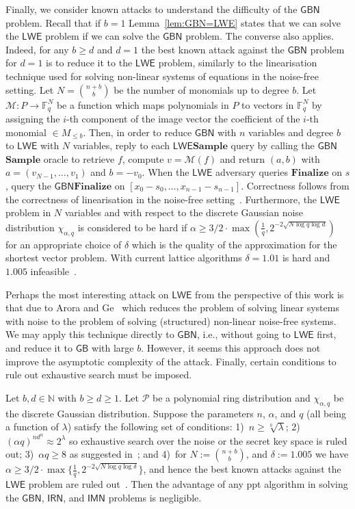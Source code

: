 \documentclass[draft]{llncs}
\newcommand{\heading}[1]{{\vspace{6pt}\noindent\sc{#1.}}}
\newcommand{\ring}[1]{\mathbb{#1}}
\newcommand{\F}{\ensuremath{\ring{F}}\xspace}
\newcommand{\GB}{\ensuremath{\mathsf{GB}}\xspace}
\newcommand{\GBN}{\ensuremath{\mathsf{GBN}}\xspace}
\newcommand{\IRN}{\ensuremath{\mathsf{IRN}}\xspace}
\newcommand{\IMN}{\ensuremath{\mathsf{IMN}}\xspace}
\newcommand{\LWE}{\ensuremath{\mathsf{LWE}}\xspace}
\newcommand{\secpar}{\lambda}
\newcommand{\Finalize}{\mathbf{Finalize}}
\newcommand{\Sample}{\mathbf{Sample}}
\begin{document}
\heading{Known Attacks} Finally, we consider known attacks to understand the difficulty of the \GBN problem. Recall that if $b=1$ Lemma~\ref{lem:GBN=LWE} states that we can solve the \LWE problem if we can solve the \GBN problem. The converse also applies. Indeed, for any $b\geq d$ and $d=1$ the best known attack against the \GBN problem for $d=1$ is to reduce it to the \LWE problem, similarly to the linearisation technique used for solving non-linear systems of equations in the noise-free setting.
Let $N = {n + b \choose b}$ be the number of monomials up to degree $b$. Let $\mathcal{M}: P \rightarrow \F_q^N$ be a function which maps polynomials in $P$ to vectors in $\F_q^N$ by assigning the $i$-th component of the image vector the coefficient of the $i$-th monomial $\in M_{\leq b}$. Then, in order to reduce \GBN with $n$ variables and degree $b$ to \LWE with $N$ variables, reply to each \LWE $\Sample$ query by calling the \GBN $\Sample$ oracle to retrieve $f$, compute $v = \mathcal{M}(f)$ and return $(a,b)$ with $a=(v_{N-1},\dots,v_{1})$ and $b=-v_0$. When the \LWE adversary queries $\Finalize$ on $s$, query the \GBN $\Finalize$ on $[x_0 - s_0,\dots,x_{n-1} - s_{n-1}]$. Correctness follows from the correctness of linearisation in the noise-free setting~\cite{Gr}. Furthermore, the \LWE problem in $N$ variables and with respect to the discrete Gaussian noise distribution $\chi_{\alpha,q}$ is considered to be hard if
$
\alpha \geq 3/2 \cdot \max ( \frac{1}{q}, 2^{-2\sqrt{N \log q \log d}} )
$
for an appropriate choice of $\delta$ which is the quality of the approximation for the shortest vector problem. 
 With current lattice algorithms $\delta = 1.01$ is hard and $1.005$ infeasible~\cite{MR09}. 

Perhaps the most interesting attack on \LWE from the perspective of this work is that due to Arora and Ge~\cite{Gr} which reduces the problem of solving linear systems with noise to the problem of solving (structured) non-linear noise-free systems. We may apply this technique directly to \GBN, i.e., without going to \LWE first, and reduce it to \GB with large $b$. However, it seems this approach does not improve the asymptotic complexity of the attack. Finally, certain conditions to rule out exhaustive search must be imposed.

\begin{definition}
Let $b,d \in\mathbb{N}$ with $b \geq d \geq 1$. Let $\mathcal{P}$ be a polynomial ring distribution and $\chi_{\alpha,q}$ be the discrete Gaussian distribution. Suppose the parameters $n$, $\alpha$, and $q$ (all being a function of $\secpar$) satisfy the following set of conditions: 1)~$n \geq \sqrt[b]{\secpar}$; 2)~$(\alpha q)^{nd^n} \approx 2^\secpar$ so exhaustive search over the noise or the secret key space is ruled out; 3)~$\alpha q \geq 8$ as suggested in~\cite{DBLP:conf/ctrsa/LindnerP11}; and 4)~for $N := {n + b \choose b}$, and $\delta := 1.005$ we have
$\alpha \geq 3/2 \cdot \max \{ \frac{1}{q},2^{-2\sqrt{N \log q \log \delta }} \}$, and 
hence the best known attacks against the \LWE problem are ruled out~\cite{MR09,cryptoeprint:2010:137}. 
Then the advantage of any ppt algorithm in solving the \GBN, \IRN, and \IMN problems is negligible.
\end{definition}
\end{document}

